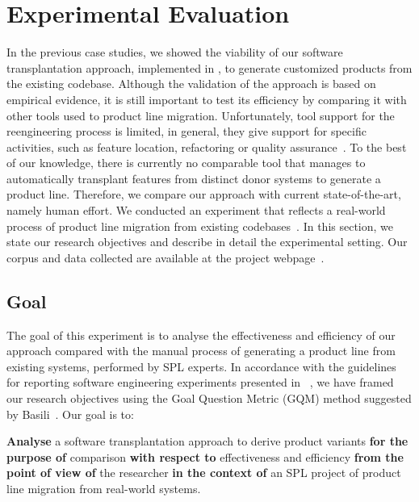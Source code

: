 \section{Experimental Evaluation} \label{sec:experiment}


In the previous case studies, we showed the viability of our software transplantation approach, implemented in \prodscalpel, to generate customized products from the existing codebase. Although the validation of the approach is based on empirical evidence, it  is  still important to test its efficiency by comparing it with other tools used to product line migration. Unfortunately, tool support for the reengineering process is limited, in general, they give support for specific activities, such as feature location, refactoring or quality assurance~\cite{Assuncao2017,Kruger2020}. To the best of our knowledge, there is currently no comparable tool that manages to automatically transplant features from distinct donor systems to generate a product line.
Therefore, we compare our approach with current state-of-the-art, namely human effort.
We conducted an experiment that reflects a real-world process of product line migration from existing codebases~\cite{Krueger2002}. In this section, we state our research objectives and describe in detail the experimental setting.
 Our corpus and data collected are available at  the project webpage~\cite{ProjectWebpage}.
 
\subsection{Goal}
The goal of this experiment is to analyse the effectiveness and efficiency of our approach compared with the manual process of generating a product line from existing systems, performed by SPL  experts. In accordance with the guidelines for reporting software engineering experiments presented in ~\cite{Wohlin2012b}, we have framed our research objectives using the Goal Question Metric (GQM) method suggested by Basili~\cite{Basili1994}. Our goal is to:

\textbf{Analyse} a software transplantation approach to derive product variants 
\textbf{for the purpose of} comparison 
\textbf{with respect to} effectiveness and efficiency 
\textbf{from the point of view of} the researcher
\textbf{in the context of} an SPL project of product line migration from real-world systems.

